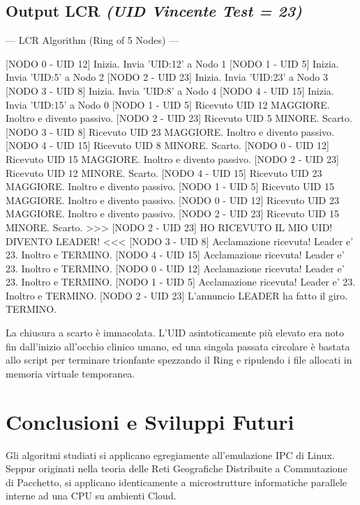 \documentclass[a4paper,12pt]{article}
\begin{document}
\subsection{Output LCR \textit{(UID Vincente Test = 23)}}
\begin{terminal}
--- LCR Algorithm (Ring of 5 Nodes) ---

[NODO 0 - UID 12] Inizia. Invia 'UID:12' a Nodo 1
[NODO 1 - UID 5] Inizia. Invia 'UID:5' a Nodo 2
[NODO 2 - UID 23] Inizia. Invia 'UID:23' a Nodo 3
[NODO 3 - UID 8] Inizia. Invia 'UID:8' a Nodo 4
[NODO 4 - UID 15] Inizia. Invia 'UID:15' a Nodo 0
[NODO 1 - UID 5] Ricevuto UID 12 MAGGIORE. Inoltro e divento passivo.
[NODO 2 - UID 23] Ricevuto UID 5 MINORE. Scarto.
[NODO 3 - UID 8] Ricevuto UID 23 MAGGIORE. Inoltro e divento passivo.
[NODO 4 - UID 15] Ricevuto UID 8 MINORE. Scarto.
[NODO 0 - UID 12] Ricevuto UID 15 MAGGIORE. Inoltro e divento passivo.
[NODO 2 - UID 23] Ricevuto UID 12 MINORE. Scarto.
[NODO 4 - UID 15] Ricevuto UID 23 MAGGIORE. Inoltro e divento passivo.
[NODO 1 - UID 5] Ricevuto UID 15 MAGGIORE. Inoltro e divento passivo.
[NODO 0 - UID 12] Ricevuto UID 23 MAGGIORE. Inoltro e divento passivo.
[NODO 2 - UID 23] Ricevuto UID 15 MINORE. Scarto.
>>> [NODO 2 - UID 23] HO RICEVUTO IL MIO UID! DIVENTO LEADER! <<<
[NODO 3 - UID 8] Acclamazione ricevuta! Leader e' 23. Inoltro e TERMINO.
[NODO 4 - UID 15] Acclamazione ricevuta! Leader e' 23. Inoltro e TERMINO.
[NODO 0 - UID 12] Acclamazione ricevuta! Leader e' 23. Inoltro e TERMINO.
[NODO 1 - UID 5] Acclamazione ricevuta! Leader e' 23. Inoltro e TERMINO.
[NODO 2 - UID 23] L'annuncio LEADER ha fatto il giro. TERMINO.
\end{terminal}
La chiusura a scarto è immacolata. L'UID asintoticamente più elevato era noto fin dall'inizio all'occhio clinico umano, ed una singola passata circolare è bastata allo script per terminare trionfante spezzando il Ring e ripulendo i file allocati in memoria virtuale temporanea.

\section{Conclusioni e Sviluppi Futuri}
Gli algoritmi studiati si applicano egregiamente all'emulazione IPC di Linux. Seppur originati nella teoria delle Reti Geografiche Distribuite a Commutazione di Pacchetto, si applicano identicamente a microstrutture informatiche parallele interne ad una CPU su ambienti Cloud.
\end{document}
